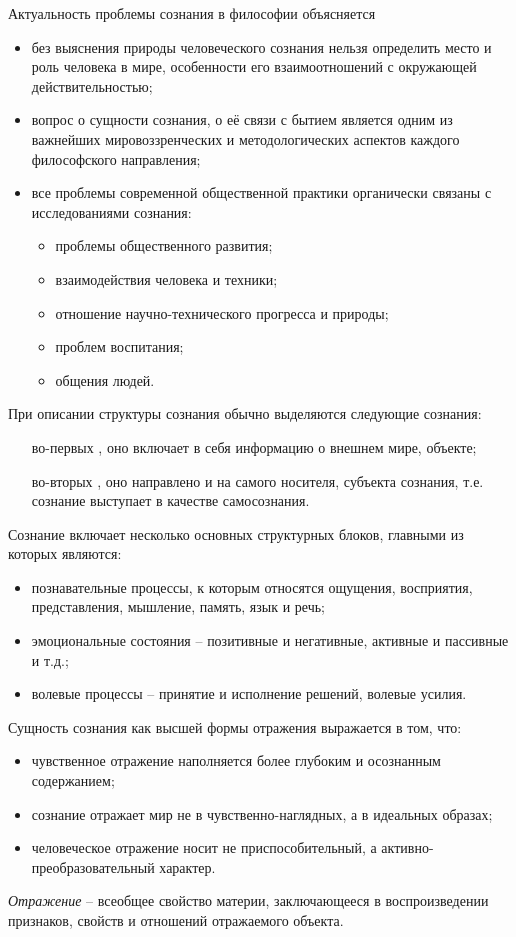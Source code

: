 
Актуальность проблемы сознания в философии объясняется
\begin{itemize}
    \item без выяснения природы человеческого сознания нельзя определить место и роль человека в мире, 
        особенности его взаимоотношений с окружающей действительностью;
    \item вопрос о сущности сознания, о её связи с бытием является одним из важнейших мировоззренческих и 
        методологических аспектов каждого философского направления;
    \item все проблемы современной общественной практики органически связаны с исследованиями сознания:
    \begin{itemize}
        \item проблемы общественного развития;
        \item взаимодействия человека и техники;
        \item отношение научно-технического прогресса и природы;
        \item проблем воспитания;
        \item общения людей.
    \end{itemize}
\end{itemize}

При описании структуры сознания обычно выделяются следующие сознания:
\begin{itemize}
    \item[во-первых], оно включает в себя информацию о внешнем мире, объекте;
    \item[во-вторых], оно направлено и на самого носителя, субъекта сознания, т.е. сознание выступает в 
        качестве самосознания.
\end{itemize}

Сознание включает несколько основных структурных блоков, главными из которых являются:
\begin{itemize}
    \item познавательные процессы, к которым относятся ощущения, восприятия, представления, мышление, 
        память, язык и речь;
    \item эмоциональные состояния -- позитивные и негативные, активные и пассивные и т.д.;
    \item волевые процессы -- принятие и исполнение решений, волевые усилия.
\end{itemize}

Сущность сознания как высшей формы отражения выражается в том, что:
\begin{itemize}
    \item чувственное отражение наполняется более глубоким и осознанным содержанием;
    \item сознание отражает мир не в чувственно-наглядных, а в идеальных образах;
    \item человеческое отражение носит не приспособительный, а активно-преобразовательный характер.
\end{itemize}

\emph{Отражение} -- всеобщее свойство материи, заключающееся в воспроизведении признаков, свойств и 
отношений отражаемого объекта. 